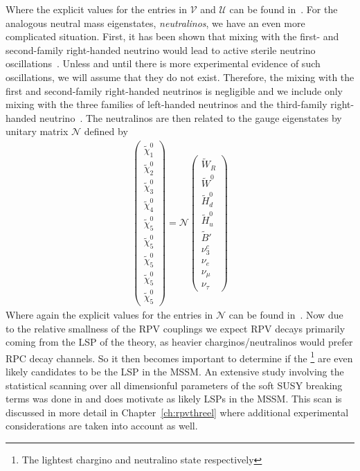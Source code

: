 Where the explicit values for the entries in  $\mathcal{V}$ and $\mathcal{U}$ can be found in~\cite{Dumitru:2018jyb}.
For the analogous neutral mass eigenstates, \emph{neutralinos}, we have an even more complicated situation.
First, it has been shown that mixing with the first- and second-family right-handed neutrino would lead to active sterile neutrino oscillations~\cite{Dumitru:2018jyb}.
Unless and until there is more experimental evidence of such oscillations, we will assume that they do not exist. 
Therefore, the mixing with the first and second-family right-handed neutrinos is negligible and we include only mixing with the three families of left-handed neutrinos and the third-family right-handed neutrino~\cite{Dumitru:2018jyb}.
The neutralinos are then related to the gauge eigenstates by unitary matrix $\mathcal{N}$ defined by
\begin{align}
    \begin{pmatrix}
       \tilde\chi_{1}^{0} \\
       \tilde\chi_{2}^{0} \\
       \tilde\chi_{3}^{0} \\
       \tilde\chi_{4}^{0} \\
       \tilde\chi_{5}^{0} \\
       \tilde\chi_{5}^{0} \\
       \tilde\chi_{5}^{0} \\
       \tilde\chi_{5}^{0} \\
       \tilde\chi_{5}^{0} 
    \end{pmatrix}
    =\mathcal{N} 
    \begin{pmatrix}
      \tilde W_{R}\\ 
      \tilde W^{0}\\ 
      \tilde H_{d}^{0}\\ 
      \tilde H_{u}^{0}\\ 
      \tilde B'\\ 
      \nu_{3}^{c}\\
      \nu_{e}\\
      \nu_{\mu}\\
      \nu_{\tau}
    \end{pmatrix}
\end{align}
Where again the explicit values for the entries in  $\mathcal{N}$ can be found in~\cite{Dumitru:2018jyb}.
Now due to the relative smallness of the RPV couplings we expect RPV decays primarily coming from the LSP of the theory, as heavier charginos/neutralinos would prefer RPC decay channels.
So it then becomes important to determine if the \chono\footnote{The lightest chargino and neutralino state respectively} are even likely candidates to be the LSP in the \BL MSSM. 
An extensive study involving the statistical scanning over all dimensionful parameters of the soft SUSY breaking terms was done in \cite{Dumitru:2018jyb} and does motivate \chono  as likely LSPs in the \BL MSSM.
This scan is discussed in more detail in Chapter~\ref{ch:rpvthreel} where additional experimental considerations are taken into account as well.


